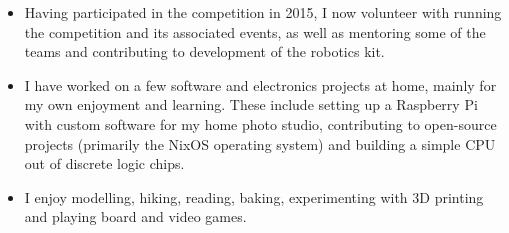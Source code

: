 
\begin{itemize}
  \item Having participated in the \studentrobotics{} competition in 2015, I now volunteer with running the competition and its associated events, as well as mentoring some of the teams and contributing to development of the robotics kit.
  \item I have worked on a few software and electronics projects at home, mainly for my own enjoyment and learning. These include setting up a Raspberry Pi with custom software for my home photo studio, contributing to open-source projects (primarily the NixOS operating system) and building a simple CPU out of discrete logic chips.
  \item I enjoy modelling, hiking, reading, baking, experimenting with 3D printing and playing board and video games.
\end{itemize}
